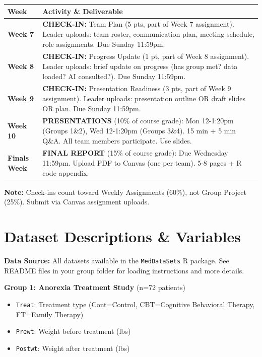 \documentclass[9pt]{article}
\begin{document}
\begin{center}
\small
\begin{tabular}{>{\bfseries}p{1.8cm}p{10cm}}
\toprule
\textbf{Week} & \textbf{Activity \& Deliverable} \\
\midrule
Week 7 & \textbf{CHECK-IN:} Team Plan (5 pts, part of Week 7 assignment). Leader uploads: team roster, communication plan, meeting schedule, role assignments. Due Sunday 11:59pm.\\
\midrule
Week 8 & \textbf{CHECK-IN:} Progress Update (1 pt, part of Week 8 assignment). Leader uploads: brief update on progress (has group met? data loaded? AI consulted?). Due Sunday 11:59pm.\\
\midrule
Week 9 & \textbf{CHECK-IN:} Presentation Readiness (3 pts, part of Week 9 assignment). Leader uploads: presentation outline OR draft slides OR plan. Due Sunday 11:59pm.\\
\midrule
Week 10 & \textbf{PRESENTATIONS} (10\% of course grade): Mon 12-1:20pm (Groups 1\&2), Wed 12-1:20pm (Groups 3\&4). 15 min + 5 min Q\&A. All team members participate. Use slides.\\
\midrule
Finals Week & \textbf{FINAL REPORT} (15\% of course grade): Due Wednesday 11:59pm. Upload PDF to Canvas (one per team). 5-8 pages + R code appendix.\\
\bottomrule
\end{tabular}
\end{center}

\textbf{Note:} Check-ins count toward Weekly Assignments (60\%), not Group Project (25\%). Submit via Canvas assignment uploads.

\vspace{2pt}

\section*{Dataset Descriptions \& Variables}

\textbf{Data Source:} All datasets available in the \texttt{MedDataSets} R package. See README files in your group folder for loading instructions and more details.

\vspace{0.3cm}

\textbf{Group 1: Anorexia Treatment Study} (n=72 patients)
\begin{itemize}
\item \texttt{Treat}: Treatment type (Cont=Control, CBT=Cognitive Behavioral Therapy, FT=Family Therapy)
\item \texttt{Prewt}: Weight before treatment (lbs)
\item \texttt{Postwt}: Weight after treatment (lbs)
\end{itemize}
\end{document}
